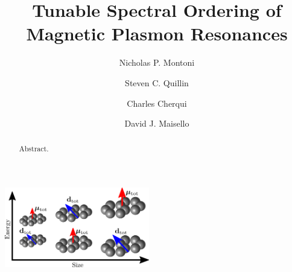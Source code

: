 \documentclass[journal=apchd5,manuscript=article]{achemso}
\author{Nicholas P. Montoni}
\author{Steven C. Quillin}
\author{Charles Cherqui}
\author{David J. Maisello}
\affiliation[Department of Chemistry, University of Washington]
{Department of Chemistry, University of Washington, Seattle, WA 98195}
\title[]
    {Tunable Spectral Ordering of Magnetic Plasmon Resonances}
\begin{document}
\begin{tocentry}
\begin{centering}
\includegraphics[height=3.5cm]{toc.png}
\end{centering}
\end{tocentry}


\begin{abstract}
Abstract.
\end{abstract}
\end{document}
